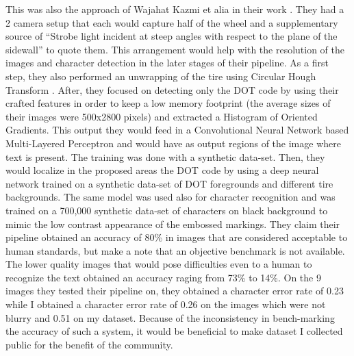 This was also the approach of Wajahat Kazmi et alia in their work \cite{article:1}. They had a 2 camera setup that each would capture half of the wheel and a supplementary source of “Strobe light incident at steep angles with respect to the plane of the sidewall” to quote them. This arrangement would help with the resolution of the images and character detection in the later stages of their pipeline. As a first step, they also performed an unwrapping of the tire using Circular Hough Transform \cite{site:circular_hough_transform}. After, they focused on detecting only the DOT code by using their crafted features in order to keep a low memory footprint (the average sizes of their images were 500x2800 pixels) and extracted a Histogram of Oriented Gradients. This output they would feed in a Convolutional Neural Network based Multi-Layered Perceptron and would have as output regions of the image where text is present. The training was done with a synthetic data-set. Then, they would localize in the proposed areas the DOT code by using a deep neural network trained on a synthetic data-set of DOT foregrounds and different tire backgrounds. The same model was used also for character recognition and was trained on a 700,000 synthetic data-set of characters on black background to mimic the low contrast appearance of the embossed markings. They claim their pipeline obtained an accuracy of 80\% in images that are considered acceptable to human standards, but make a note that an objective benchmark is not available. The lower quality images that would pose difficulties even to a human to recognize the text obtained an accuracy raging from 73\% to 14\%. On the 9 images they tested their pipeline on, they obtained a character error rate of 0.23 while I obtained a character error rate of 0.26 on the images which were not blurry and 0.51 on my dataset. Because of the inconsistency in bench-marking the accuracy of such a system, it would be beneficial to make dataset I collected public for the benefit of the community.


